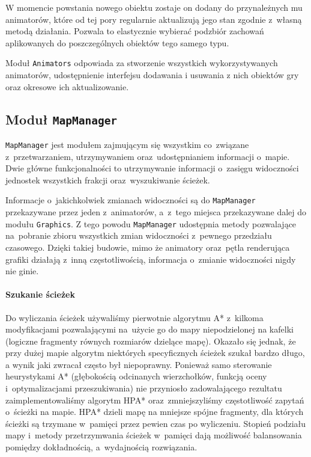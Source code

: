 \documentclass[licencjacka]{pracamgr}
\begin{document}
    W momencie powstania nowego obiektu zostaje on dodany do przynależnych mu animatorów, które od tej pory regularnie
    aktualizują jego stan zgodnie z~własną metodą działania. Pozwala to elastycznie wybierać podzbiór zachowań aplikowanych
    do poszczególnych obiektów tego samego typu. 
    
    Moduł \texttt{Animators} odpowiada za stworzenie wszystkich wykorzystywanych animatorów, udostępnienie interfejsu
    dodawania i usuwania z nich obiektów gry oraz okresowe ich aktualizowanie. 

  \subsection{Moduł \texttt{MapManager}}
    \texttt{MapManager} jest modułem zajmującym się wszystkim co~związane z~przetwarzaniem, utrzymywaniem
    oraz~udostępnianiem informacji o~mapie. Dwie główne funkcjonalności to utrzymywanie informacji o~zasięgu widoczności
    jednostek wszystkich frakcji oraz~wyszukiwanie ścieżek.

    Informacje o~jakichkolwiek zmianach widoczności są do \texttt{MapManager} przekazywane przez jeden z~animatorów,
    a~z~tego miejsca przekazywane dalej do modułu \texttt{Graphics}. Z tego powodu \texttt{MapManager} udostępnia metody
    pozwalające na~pobranie zbioru wszystkich zmian widoczności z~pewnego przedziału czasowego. Dzięki takiej budowie,
    mimo że animatory oraz~pętla renderująca grafiki działają z~inną częstotliwością, informacja o~zmianie widoczności
    nigdy nie ginie.

    \paragraph{Szukanie ścieżek}
      Do wyliczania ścieżek używaliśmy pierwotnie algorytmu A*\cite{A*} z~kilkoma modyfikacjami pozwalającymi na~użycie go
      do mapy niepodzielonej na kafelki (logiczne fragmenty równych rozmiarów dzielące mapę). Okazało się jednak, że przy
      dużej mapie algorytm niektórych specyficznych ścieżek szukał bardzo długo, a wynik jaki zwracał często był
      niepoprawny. Ponieważ samo sterowanie heurystykami A* (głębokością odcinanych wierzchołków, funkcją oceny
      i~optymalizacjami przeszukiwania) nie przyniosło zadowalającego rezultatu zaimplementowaliśmy algorytm HPA*\cite{HPA}
      oraz~zmniejszyliśmy częstotliwość zapytań o~ścieżki na mapie. HPA* dzieli mapę na mniejsze spójne fragmenty, dla
      których ścieżki są trzymane w~pamięci przez pewien czas po wyliczeniu. Stopień podziału mapy i~metody przetrzymwania
      ścieżek w~pamięci dają możliwość balansowania pomiędzy dokładnością, a~wydajnością rozwiązania.
\end{document}
